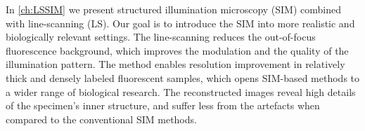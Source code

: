 In \autoref{ch:LSSIM} we present structured illumination microscopy (SIM) combined with line-scanning (LS). Our goal is to introduce the SIM into more realistic and biologically relevant settings. The line-scanning reduces the out-of-focus fluorescence background, which improves the modulation and the quality of the illumination pattern. The method enables resolution improvement in relatively thick and densely labeled fluorescent samples, which opens SIM-based methods to a wider range of biological research. The reconstructed images reveal high details of the specimen's inner structure, and suffer less from the artefacts when compared to the conventional SIM methods.  


